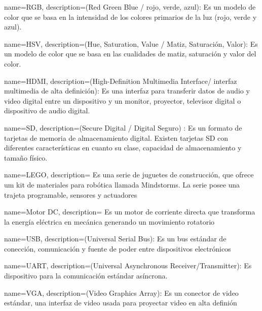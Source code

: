 {
  name=RGB,
  description={(Red Green Blue / rojo, verde, azul): Es un modelo de color que se basa en la intensidad de los colores primarios de la luz (rojo, verde y azul).}
}
  
{
  name=HSV,
  description={(Hue, Saturation, Value / Matiz, Saturación, Valor): Es un modelo de color que se basa en las cualidades de matiz, saturación y valor del color.}
}

{
  name=HDMI,
  description={(High-Definition Multimedia Interface/ interfaz multimedia de alta definición): Es una interfaz para transferir datos de audio y video digital entre un dispositivo y un monitor, proyector, televisor digital o dispositivo de audio digital.}
}

{
  name=SD,
  description={(Secure Digital / Digital Seguro) : Es un formato de tarjetas de memoria de almacenamiento digital. Existen tarjetas SD con diferentes características en cuanto su clase, capacidad de almacenamiento y tamaño físico.}
}  

{
  name=LEGO,
  description={ Es una serie de juguetes de construcci\'on, que ofrece um kit de materiales para rob\'otica llamada Mindstorms. La serie posee una trajeta programable, sensores y actuadores}
}  

{
  name=Motor DC,
  description={ Es un motor de corriente directa que transforma la energ\'ia el\'ectrica en mec\'anica generando un movimiento rotatorio}
}  

{
  name=USB,
  description={(Universal Serial Bus): Es un bus est\'andar de conecci\'on, comunicaci\'on y fuente de poder entre dispositivos electr\'onicos}
}  


{
  name=UART,
  description={(Universal Asynchronous Receiver/Transmitter): Es dispositivo para la comunicaci\'on est\'andar as\'incrona. }
}  

{
  name=VGA,
  description={(Video Graphics Array): Es un conector de video est\'andar, una interfaz de video usada para proyectar video en alta defini\'on }
}  